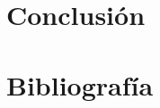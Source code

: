 \documentclass[a4paper]{article}
\numberwithin{equation}{section}
\begin{document}
\newpage




\section{Conclusión}


\newpage

\section{Bibliografía}



\end{document}
